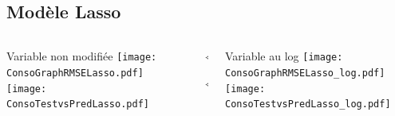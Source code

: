 \documentclass[8pt,aspectratio=169,hyperref={unicode=true}]{beamer}
\begin{document}
\subsection{Modèle Lasso}
\begin{frame}{\insertsubsection}
  \begin{columns}[t]
    \begin{column}{.33\textwidth}
      \centering Variable non modifiée
      \texttt{[image: ConsoGraphRMSELasso.pdf]}
      \texttt{[image: ConsoTestvsPredLasso.pdf]}
    \end{column}
    \begin{column}{.33\textwidth}
      $\Longleftarrow$
      \scriptsize
      {\centering
        }
      

      \normalsize
      $\Longleftarrow$

      \raggedleft{$\Longrightarrow$}
      \scriptsize
      {\centering
        }
      

      \normalsize
      \raggedleft{$\Longrightarrow$}
    \end{column}
    \begin{column}{.33\textwidth}
      \centering Variable au log
      \texttt{[image: ConsoGraphRMSELasso\_log.pdf]}
      \texttt{[image: ConsoTestvsPredLasso\_log.pdf]}
    \end{column}
  \end{columns}
\end{frame}
\end{document}
